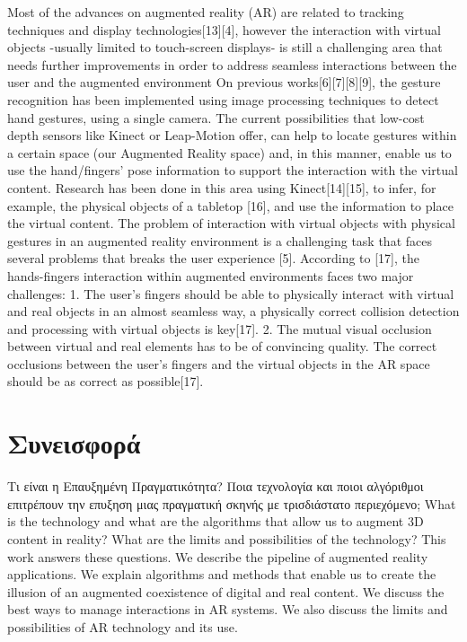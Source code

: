 %

 











Most of the advances on augmented reality (AR) are related to tracking techniques and display technologies[13][4], however the interaction with virtual objects -usually limited to touch-screen displays- is still a challenging area that needs further improvements in order to address seamless interactions between the user and the augmented environment On previous works[6][7][8][9], the gesture recognition has been implemented using image processing techniques to detect hand gestures, using a single camera. The current possibilities that low-cost depth sensors like Kinect or Leap-Motion offer, can help to locate gestures within a certain space (our Augmented Reality space) and, in this manner, enable us to use the hand/fingers’ pose information to support the interaction with the virtual content. Research has been done in this area using Kinect[14][15], to infer, for example, the physical objects of a tabletop [16], and use the information to place the virtual content. The problem of interaction with virtual objects with physical gestures in an augmented reality environment is a challenging task that faces several problems that breaks the user experience [5]. According to [17], the hands-fingers interaction within augmented environments faces two major challenges: 1. The user’s fingers should be able to physically interact with virtual and real objects in an almost seamless way, a physically correct collision detection and processing with virtual objects is key[17]. 2. The mutual visual occlusion between virtual and real elements has to be of convincing quality. The correct occlusions between the user’s fingers and the virtual objects in the AR space should be as correct as possible[17].







\section{Συνεισφορά}



Τι είναι η Επαυξημένη Πραγματικότητα? Ποια τεχνολογία και ποιοι αλγόριθμοι επιτρέπουν την επυξηση μιας πραγματική σκηνής με τρισδιάστατο περιεχόμενο; What is the technology and what are the algorithms that allow us to augment 3D content in reality? What are the limits and possibilities of the technology? This work answers these questions. We describe the pipeline of augmented reality applications. We explain algorithms and methods that enable us to create the illusion of an augmented coexistence of digital and real content. We discuss the best ways to manage interactions in AR systems. We also discuss the limits and possibilities of AR technology and its use.


